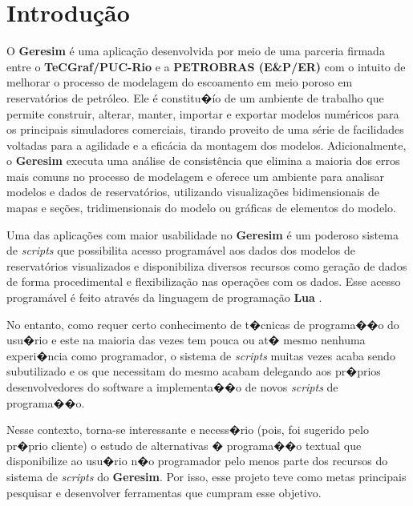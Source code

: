 \documentclass[dissertacao,modelo1,brazil]{ThesisPUC}
\begin{document}
\chapter{Introdução}

O \textbf{Geresim} \'{e} uma aplica\c{c}\~ao desenvolvida por meio de uma
parceria firmada entre o \textbf{TeCGraf/PUC-Rio}
e a \textbf{PETROBRAS (E\&P/ER)} com o intuito de melhorar o processo de modelagem do escoamento em meio 
poroso em reservat\'{o}rios de petr\'{o}leo. Ele \'{e} constitu�\'{i}o de um ambiente de trabalho que permite 
construir, alterar, manter, importar e exportar modelos num\'{e}ricos para os principais simuladores 
comerciais, tirando proveito de uma s\'{e}rie de facilidades voltadas para a agilidade e a efic\'{a}cia 
da montagem dos modelos. Adicionalmente, o \textbf{Geresim} executa uma an\'{a}lise de consist\^{e}ncia que 
elimina a maioria dos erros mais comuns no processo de modelagem e oferece um ambiente para 
analisar modelos e dados de reservat\'{o}rios, utilizando visualiza\c{c}\~{o}es bidimensionais de mapas 
e se\c{c}\~{o}es, tridimensionais do modelo ou gr\'{a}ficas de elementos do modelo\cite{Tecg06}. 

Uma das aplica\c{c}\~{o}es com maior usabilidade no \textbf{Geresim} \'{e} um poderoso sistema de \emph{scripts} que possibilita
acesso program\'{a}vel aos dados dos modelos de reservat\'{o}rios visualizados e disponibiliza diversos 
recursos como gera\c{c}\~{a}o de dados de forma procedimental e flexibiliza\c{c}\~{a}o
nas opera\c{c}\~{o}es com os dados.
Esse acesso program\'{a}vel \'{e} feito atrav\'{e}s da linguagem de programa\c{c}\~{a}o \textbf{Lua} \cite{Ieru03}.

No entanto, como requer certo conhecimento de t�cnicas de programa��o do usu�rio e este na maioria das
vezes tem pouca ou at� mesmo nenhuma experi�ncia como programador, 
o sistema de \emph{scripts} muitas vezes 
acaba sendo subutilizado e os que necessitam do mesmo acabam delegando aos pr�prios desenvolvedores 
do software a implementa��o de novos \emph{scripts} de programa��o.

Nesse contexto, torna-se interessante e necess�rio (pois, foi sugerido pelo pr�prio cliente) o estudo
de alternativas � programa��o textual %
que disponibilize ao usu�rio n�o programador pelo menos parte dos recursos do sistema de \emph{scripts}
do \textbf{Geresim}.
Por isso, esse projeto teve como metas principais pesquisar e desenvolver ferramentas
que cumpram esse objetivo.
\end{document}
